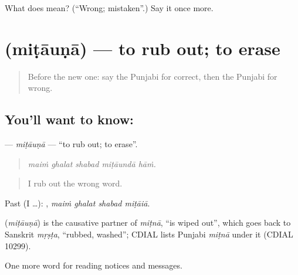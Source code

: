 \begin{tcolorbox}[breakable,colback=teal!4,colframe=teal!35!black,title={Before you move on}]
What does  mean? (\textquotedblleft{}Wrong; mistaken\textquotedblright{}.) Say it once more.
\end{tcolorbox}
\section[\texorpdfstring{\pa{ਮਿਟਾਉਣਾ} (miṭāuṇā)}{ਮਿਟਾਉਣਾ (miṭāuṇā)}]{ (miṭāuṇā) — to rub out; to erase}

\label{lesson:PA-C254-mitauna}



\begin{quote}
Before the new one: say the Punjabi for correct, then the Punjabi for wrong.
\end{quote}

\subsection*{You'll want to know: }
\textbf{} — \emph{miṭāuṇā} — \textquotedblleft{}to rub out; to erase\textquotedblright{}.

\begin{quote}
    
\end{quote}

\begin{quote}
\emph{maiṁ ghalat shabad miṭāundā hāṁ.}
\end{quote}

\begin{quote}
I rub out the wrong word.
\end{quote}

Past (I …):    , \emph{maiṁ ghalat shabad miṭāiā}.

\begin{cousinweb}
\textbf{} (\emph{miṭāuṇā}) is the causative partner of \emph{miṭnā}, \textquotedblleft{}is wiped out\textquotedblright{}, which goes back to Sanskrit \emph{mṛṣṭa}, \textquotedblleft{}rubbed, washed\textquotedblright{}; CDIAL lists Punjabi \emph{miṭnā} under it (CDIAL 10299).
\end{cousinweb}

\begin{grammarlens}[title={What you've built}]
One more word for reading notices and messages.
\end{grammarlens}

